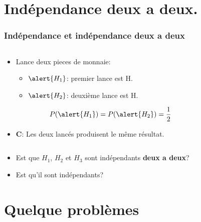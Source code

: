 \documentclass{beamer}
\begin{document}
\section{Indépendance deux a deux.}
\begin{frame}[t]
  \frametitle{Indépendance et indépendance deux a deux}

  \begin{columns}
    \begin{column}{0.5\textwidth}
      \begin{itemize}
        \small
        \item Lance deux pieces de monnaie:
          \begin{itemize}
            \small
            \item $\alert{H_1}$: premier lance est H.
            \item $\alert{H_2}$: deuxième lance est H.
          \end{itemize}
          \begin{equation*}
          P(\alert{H_1})=P(\alert{H_2}) =  \frac{1}{2}
          \end{equation*}
          \pause
        \item $\mathbf{C}$: Les deux lancés produisent le même résultat.
      \end{itemize}
    \end{column}
    \begin{column}{0.5\textwidth}
    \end{column}
  \end{columns}
  
  \vspace*{1cm}
  \pause
  \begin{itemize}
    \item Est que $H_1$, $H_2$ et $H_3$ sont indépendants \textbf{deux a
      deux}?\\[8pt]
    \item Est qu'il sont indépendants?
  \end{itemize}
\end{frame}
\section{Quelque problèmes}
\end{document}
